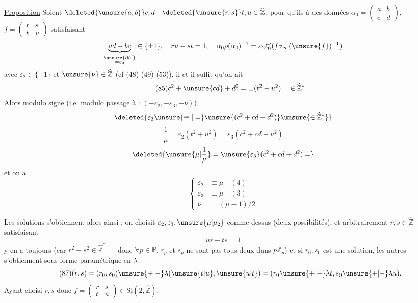 \uline{Proposition} Soient $\deleted{\unsure{a,b}}c,d\quad\deleted{\unsure{r,s}}t,u\in\widehat{\mathbb Z}$,
pour qu'ils  à des données
$\alpha_0=\begin{pmatrix}a&b\\c&d\end{pmatrix}$,
$f=\begin{pmatrix}r&s\\t&u\end{pmatrix}$ satisfaisant
\[
\underbrace{ad-bc}_{\substack{\unsure{\text{déf}}\\=\varepsilon_3}}\in\{\pm1\},
\quad ru-st=1,
\quad\alpha_0\rho(\alpha_0)^{-1}=\varepsilon_2\ell_0^{\nu}(f\sigma_\infty(\unsure{f})^{-1})
\]
avec $\varepsilon_2\in\{\pm1\}$ et $\unsure{\nu}\in\widehat{\mathbb Z}$
 (cf (48) (49) (53)),
il  et  il suffit qu'on ait
\[
\tag{85}
c^2+\unsure{cd}+d^2=\pm(t^2+u^2)\quad\in\widehat{\mathbb Z}^*
\]
Alors 
modulo signe (i.e. modulo passage à : $(-\varepsilon_2,-\varepsilon_3,-\nu)$)
\[
\deleted{\varepsilon_3\unsure{\equiv|=}\unsure{(c^2+cd+d^2)}\unsure{\in\widehat{\mathbb Z}^*}}
\]
\[
\tag{86}
\frac1\mu=\varepsilon_2(t^2+u^2)=\varepsilon_3(c^2+cd+u^2)
\]
\[
\deleted{\unsure{\mu|\frac1\mu}=\unsure{\varepsilon_3}(c^2+cd+d^2)=}
\]
et on a
\[
\tag{87}
\left\{\begin{aligned}
\varepsilon_2&\equiv\mu\quad(4)\\
\varepsilon_3&\equiv\mu\quad(3)\\
\nu&=(\mu-1)/2
\end{aligned}\right.
\]



Les solutions s'obtiennent alors ainsi : on choisit
$\varepsilon_2,\varepsilon_3,\unsure{\mu|\mu_2}$ comme dessus (deux possibilités),  et arbitrairement $r,s\in\widehat{\mathbb Z}$ satisfaisant
\[
ur-ts=1
\]
 y en a toujours (car $r^2+s^2\in\widehat{\mathbb Z}^*$ --- donc
$\forall p\in\mathbb P$, $r_p$ et $s_p$ ne sont pas tous deux dans $p\mathbb Z_p$)
et si $r_0,s_0$ est une solution, les autres s'obtiennent sous forme paramétrique en $\lambda$
\[
\tag{87}
(r,s)=(r_0,s_0)\unsure{+|-}\lambda(\unsure{t|u},\unsure{u|t})
=(r_0\unsure{+|-}\lambda t,s_0\unsure{+|-}\lambda u).
\]
Ayant choisi $r,s$ donc $f=\begin{pmatrix}r&s\\t&u\end{pmatrix}\in\mathrm{Sl}(2,\widehat{\mathbb Z})$,


